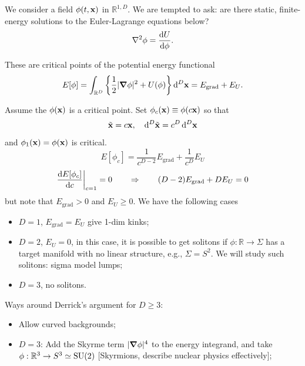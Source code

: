 \documentclass[a4paper,11pt]{article}
\begin{document}
    We consider a field $\phi(t, \vb x)$ in $\mathbb{R}^{1,D}$. We are tempted to ask: are there static, finite-energy solutions to the Euler-Lagrange equations below?
    \begin{equation}
        \laplacian \phi = \dv{U}{\phi}.
    \end{equation} 

    These are critical points of the potential energy functional 
    \begin{equation}
        E[\phi] = \int_{\mathbb{R}^D} \left\{ \frac{1}{2} |\grad \phi|^2 + U(\phi) \right\} \dd[D]{\vb x} = E_\text{grad} + E_U.
    \end{equation}

    Assume the $\phi(\vb x)$ is a critical point. Set $\phi_c(\vb x) \equiv \phi(c \vb x)$ so that 
    \begin{equation}
        \tilde{\vb x} = c \vb x, \quad \dd[D]{\tilde{\vb x}} = c^D \dd[D]{\vb x}
    \end{equation}
    and $\phi_1(\vb x) = \phi(\vb x)$ is critical. 
    \begin{equation}
        E[\phi_c] = \frac{1}{c^{D-2}} E_\text{grad} + \frac{1}{c^{D}} E_U
    \end{equation}
    \begin{equation}
        \dv{E[\phi_c]}{c}\bigg|_{c=1} = 0 \qquad \Rightarrow\qquad (D-2) E_\text{grad} + D E_U = 0
    \end{equation}
    but note that $E_\text{grad} > 0$ and $E_U \geq 0$. We have the following cases 
    \begin{itemize}
        \item $D=1$, $E_\text{grad} = E_U$ give 1-dim kinks;
        \item $D=2$, $E_U = 0$, in this case, it is possible to get solitons if $\phi: \mathbb{R} \to \Sigma$ has a target manifold with no linear structure, e.g., $\Sigma = S^2$. We will study such solitons: sigma model lumps;
        \item $D=3$, no solitons.
    \end{itemize}

    Ways around Derrick's argument for $D \geq 3$:
    \begin{itemize}
        \item Allow curved backgrounds;
        \item $D=3$: Add the Skyrme term $|\grad \phi|^4$ to the energy integrand, and take $\phi: \mathbb{R}^3 \to S^3 \simeq \operatorname{SU}(2)$ [Skyrmions, describe nuclear physics effectively];
    \end{itemize}
\end{document}
